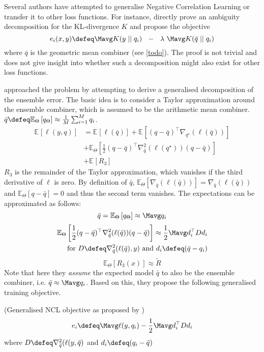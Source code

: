 \documentclass[../main.tex]{subfiles}
\begin{document}
Several authors have attempted to generalise Negative Correlation Learning or transfer it to other loss functions. For instance, \cite{webb21} directly prove an ambiguity decomposition for the KL-divergence $K$ and propose the objective
$$
e_{i}(x,y) \defeq \Mavg K(y \mid\mid q_{i}) ~ ~ - ~ ~ \lambda ~ \Mavg K(\bar{q} \mid\mid q_{i})
$$
where $\bar{q}$ is the geometric mean combiner (see \ref{todo}). The proof is not trivial and does not give insight into whether such a decomposition might also exist for other loss functions.

\cite{buschjaeger} approached the problem by attempting to derive a generalised decomposition of the ensemble error. The basic idea is to consider a Taylor approximation around the ensemble combiner, which is assumed to be the arithmetic mean combiner. $\bar{q} \defeq \mathbb{E}_{\Theta}\left[ q_{\Theta} \right] \approx \frac{1}{M}\sum_{i=1}^M q_i$.
\begin{align*}
\mathbb{E}_{}\left[ \ell(y, q) \right]  &= 
\mathbb{E}_{}\left[ \ell(\bar{q}) \right] 
+ \mathbb{E}_{}\left[ (q - \bar{q})^\top \nabla_{q^\star}(\ell (\bar{q})) \right]  \\
&+ \mathbb{E}_{\Theta}\left[ \frac{1}{2} (q-\bar{q})^\top\nabla^2_{\bar{q}}(\ell(q^\star))(q-\bar{q}) \right] \\
&+ \mathbb{E}_{}\left[ R_{3} \right] 
\end{align*}
$R_{3}$ is the remainder of the Taylor approximation, which vanishes if the third derivative of $\ell$ is zero.
By definition of $\bar{q}$, $\mathbb{E}_{\Theta}\left[ \nabla_{\bar{q}}(\ell(\bar{q})) \right] = \nabla_{\bar{q}}(\ell(\bar{q}))$ and $\mathbb{E}_{\Theta}\left[ q-\bar{q} \right] = 0$ and thus the second term vanishes.
The expectations can be approximated as follows:
$$
\bar{q} = \mathbb{E}_{{\Theta}}\left[ q_{\Theta} \right] \approx \Mavg q_{i}
$$
\begin{align*}
\mathbb{E}_{\Theta}\left[ \frac{1}{2} (q-\bar{q})^\top\nabla^2_{\bar{q}}(\ell(\bar{q}))(q-\bar{q}) \right] \approx \frac{1}{2}\Mavg d_{i}^\top D d_{i} \\
\text{~~for $D \defeq \nabla^2_{\bar{q}}(\ell(\bar{q}),y)$ and $d_{i} \defeq (\bar{q} - q_i)$}
\end{align*}
\vspace{0.5em}
$$
\mathbb{E}_{\Theta}\left[ R_{3}(x) \right]  \approx \tilde{R}
$$
Note that here they \textit{assume} the expected model $\bar{q}$ to also be the ensemble combiner, i.e. $\bar{q} \approx \Mavg q_{i}$. 
Based on this, they propose the following generalised training objective.
\begin{definition} (Generalised NCL objective as proposed by \cite{buschj})
    \label{def:buschj-ncl-objective}
$$
e_i \defeq \Mavg \ell(y,q_{i}) - \frac{1}{2} \Mavg d_{i}^\top D d_{i}
$$
where $D \defeq \nabla^2_{\bar{q}}(\ell(y, \bar{q})$ and $d_{i} \defeq (q_{i} - \bar{q})$
\end{definition}
\end{document}
